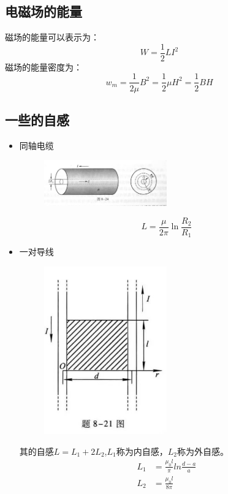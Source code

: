 \documentclass{ctexart}
\begin{document}
\subsection{电磁场的能量}
磁场的能量可以表示为：
$$
    W = \frac{1}{2} LI^2
$$
磁场的能量密度为：
$$
    w_m =  \frac{1}{2\mu} B^2 = \frac{1}{2}\mu H^2 = \frac{1}{2} BH
$$
\subsection{一些的自感}
\begin{itemize}
    \item 同轴电缆
    \begin{figure}[H]
        \centering
        \includegraphics[width=0.5\textwidth]{img/8-24.jpg}
    \end{figure}
    $$
        L = \frac{\mu}{2\pi} \ln \frac{R_2}{R_1}
    $$
    \item 一对导线
    \begin{figure}[H]
        \centering
        \includegraphics[width=0.5\textwidth]{img/8-21.jpg}
    \end{figure}
    其的自感$L = L_1 +2L_2$,$L_1$称为内自感，$L_2$称为外自感。
    \begin{align*}
        L_1 &= \frac{\mu_0l}{\pi} ln \frac{d-a}{a} \\
        L_2 &= \frac{\mu_0 l}{8\pi}
    \end{align*}
\end{itemize}
\end{document}
